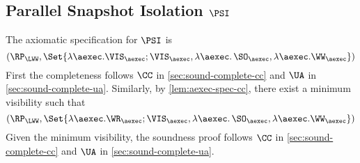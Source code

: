 \subsection{Parallel Snapshot Isolation \(\PSI\)}
\label{sec:sound-complete-psi}

The axiomatic specification for \( \PSI \) is 
\[ 
    (\RP_{\LWW}, \Set{\lambda \aexec. \VIS_{\aexec} ; \VIS_{\aexec}, \lambda \aexec \ldotp \SO_\aexec, \lambda \aexec. \WW_\aexec })
\]
First the completeness follows \( \CC \) in \cref{sec:sound-complete-cc} and \( \UA \) in \cref{sec:sound-complete-ua}.
Similarly, by \cref{lem:aexec-spec-cc},
there exist a minimum visibility such that 
\[ 
    (\RP_{\LWW}, \Set{\lambda \aexec. \WR_{\aexec} ; \VIS_{\aexec}, \lambda \aexec \ldotp \SO_\aexec, \lambda \aexec. \WW_\aexec })
\]
Given the minimum visibility, the soundness proof follows \( \CC \) in \cref{sec:sound-complete-cc} and \( \UA \) in \cref{sec:sound-complete-ua}.

